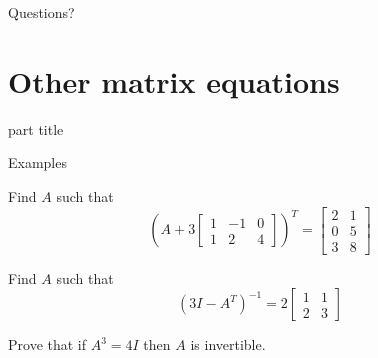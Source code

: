 \documentclass{beamer}
\begin{document}
\begin{frame}
  Questions?
\end{frame}

\section{Other matrix equations}

\begin{frame}
  \begin{beamercolorbox}[sep=12pt,center]{part title}
    \insertsection\par
  \end{beamercolorbox}
\end{frame}

\begin{frame}{Examples}
  \begin{example}
    Find $A$ such that
    \begin{equation*}
      \left(A+3 \left[
	\begin{array}{ccc}
          1&-1&0\\
          1&2&4
	\end{array}
      \right]\right)^T=
      \left[
	\begin{array}{cc}
          2&1\\
          0&5\\
          3&8
	\end{array}
      \right]
    \end{equation*}
  \end{example}
  \begin{example}
    Find $A$ such that
    \begin{equation*}
      (3I-A^T)^{-1} = 2\left[
	\begin{array}{cc}
          1&1\\
          2&3
	\end{array}
      \right]
    \end{equation*}
  \end{example}
  \begin{example}
    Prove that if $A^3 = 4I$ then $A$ is invertible.
  \end{example}
\end{frame}
\end{document}
